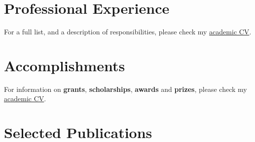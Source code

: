 \documentclass[11pt,a4paper,]{awesome-cv}
\begin{document}
\hypertarget{professional-experience}{%
\section{Professional Experience}\label{professional-experience}}

For a full list, and a description of responsibilities, please check my
\href{https://jdleongomez.github.io/Mile_CV/CV_eng/MVA_CV_en.pdf}{academic
CV}.

\begin{cventries}
    \vspace{-4.0mm}
    \vspace{-4.0mm}
\end{cventries}

\hypertarget{accomplishments}{%
\section{Accomplishments}\label{accomplishments}}

For information on \textbf{grants}, \textbf{scholarships},
\textbf{awards} and \textbf{prizes}, please check my
\href{https://jdleongomez.github.io/Mile_CV/CV_eng/MVA_CV_en.pdf}{academic
CV}.

\hypertarget{selected-publications}{%
\section{Selected Publications}\label{selected-publications}}
\end{document}
